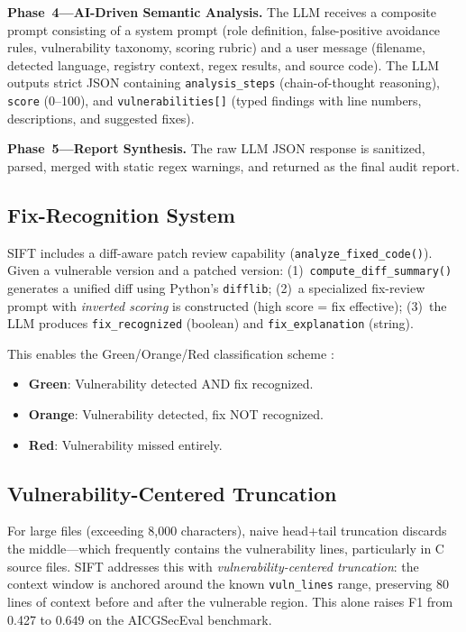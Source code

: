 \documentclass[conference]{IEEEtran}
\begin{document}
\textbf{Phase~4---AI-Driven Semantic Analysis.} The LLM receives a composite prompt consisting of a system prompt (role definition, false-positive avoidance rules, vulnerability taxonomy, scoring rubric) and a user message (filename, detected language, registry context, regex results, and source code). The LLM outputs strict JSON containing \texttt{analysis\_steps} (chain-of-thought reasoning), \texttt{score} (0--100), and \texttt{vulnerabilities[]} (typed findings with line numbers, descriptions, and suggested fixes).

\textbf{Phase~5---Report Synthesis.} The raw LLM JSON response is sanitized, parsed, merged with static regex warnings, and returned as the final audit report.

\subsection{Fix-Recognition System}

SIFT includes a diff-aware patch review capability (\texttt{analyze\_fixed\_code()}). Given a vulnerable version and a patched version: (1)~\texttt{compute\_diff\_summary()} generates a unified diff using Python's \texttt{difflib}; (2)~a specialized fix-review prompt with \textit{inverted scoring} is constructed (high score = fix effective); (3)~the LLM produces \texttt{fix\_recognized} (boolean) and \texttt{fix\_explanation} (string).

This enables the Green/Orange/Red classification scheme \cite{b5}:
\begin{itemize}
\item \textbf{Green}: Vulnerability detected AND fix recognized.
\item \textbf{Orange}: Vulnerability detected, fix NOT recognized.
\item \textbf{Red}: Vulnerability missed entirely.
\end{itemize}

\subsection{Vulnerability-Centered Truncation}

For large files (exceeding 8,000 characters), naive head+tail truncation discards the middle---which frequently contains the vulnerability lines, particularly in C source files. SIFT addresses this with \textit{vulnerability-centered truncation}: the context window is anchored around the known \texttt{vuln\_lines} range, preserving 80 lines of context before and after the vulnerable region. This alone raises F1 from 0.427 to 0.649 on the AICGSecEval benchmark.
\end{document}
